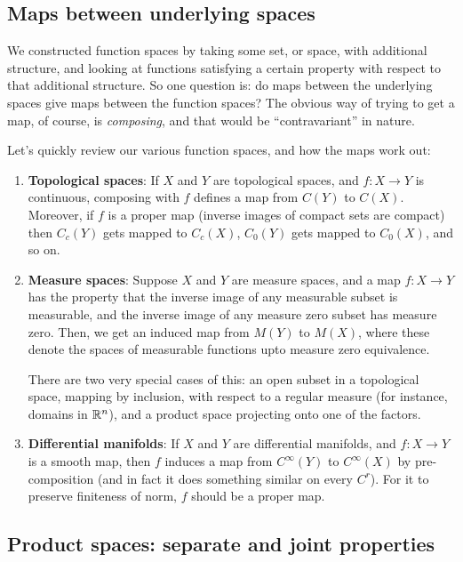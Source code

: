 \documentclass[a4paper]{amsart}
\begin{document}
\subsection{Maps between underlying spaces}

We constructed function spaces by taking some set, or space, with
additional structure, and looking at functions satisfying a certain
property with respect to that additional structure. So one question is:
do maps between the underlying spaces give maps between the function
spaces? The obvious way of trying to get a map, of course, is {\em
  composing}, and that would be ``contravariant'' in nature.

Let's quickly review our various function spaces, and how the maps
work out:

\begin{enumerate}

\item {\bf Topological spaces}: If $X$ and $Y$ are topological spaces,
  and $f:X \to Y$ is continuous, composing with $f$ defines a map from
  $C(Y)$ to $C(X)$. Moreover, if $f$ is a proper map (inverse images
  of compact sets are compact) then $C_c(Y)$ gets mapped to $C_c(X)$,
  $C_0(Y)$ gets mapped to $C_0(X)$, and so on.

\item {\bf Measure spaces}: Suppose $X$ and $Y$ are measure spaces,
  and a map $f:X \to Y$ has the property that the inverse image of any
  measurable subset is measurable, and the inverse image of any
  measure zero subset has measure zero. Then, we get an induced map
  from $M(Y)$ to $M(X)$, where these denote the spaces of measurable
  functions upto measure zero equivalence.

  There are two very special cases of this: an open subset in a
  topological space, mapping by inclusion, with respect to a regular
  measure (for instance, domains in $\mathbb{R}^n$), and a product space
  projecting onto one of the factors.

\item {\bf Differential manifolds}: If $X$ and $Y$ are differential
  manifolds, and $f:X \to Y$ is a smooth map, then $f$ induces a map
  from $C^\infty(Y)$ to $C^\infty(X)$ by pre-composition (and in fact
  it does something similar on every $C^r$). For it to preserve
  finiteness of norm, $f$ should be a proper map.

\end{enumerate}

\subsection{Product spaces: separate and joint properties}
\end{document}
